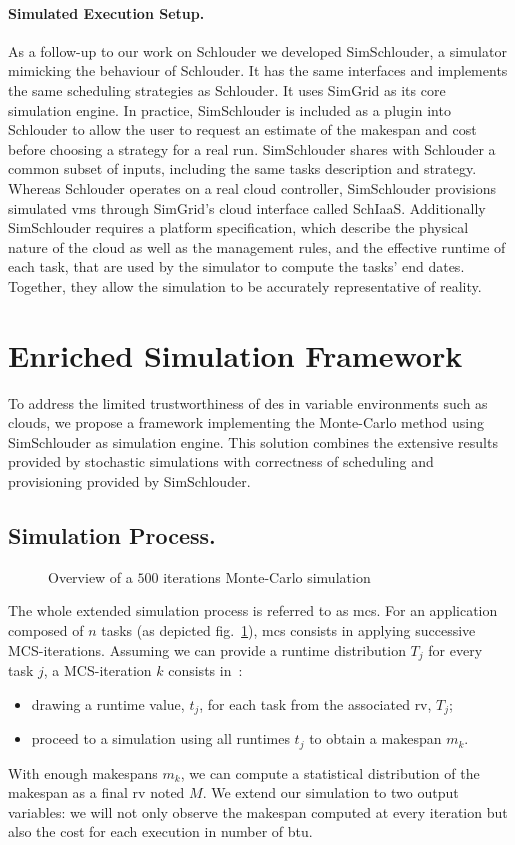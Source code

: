 \documentclass[]{llncs}
\begin{document}
\paragraph{Simulated Execution Setup.}
As a follow-up to our work on Schlouder we developed SimSchlouder, a simulator
mimicking the behaviour of Schlouder. It has the same interfaces and implements
the same scheduling strategies as Schlouder. It uses SimGrid as its core
simulation engine. In practice, SimSchlouder is included as a plugin into
Schlouder to allow the user to request an estimate of the makespan and cost
before choosing a strategy for a real run.
%
SimSchlouder  shares with Schlouder a common subset of inputs, including
the same tasks description and strategy. Whereas Schlouder operates on a
real cloud controller, SimSchlouder provisions simulated \acp{vm} through
SimGrid's cloud interface called SchIaaS. Additionally SimSchlouder requires a
platform specification, which describe the physical nature of the cloud as well
as the management rules, and the effective runtime of each task, that are used
by the simulator to compute the tasks' end dates. Together, they allow the
simulation to be accurately representative of reality.

\section{Enriched Simulation Framework}\label{sec:enriched-sim}


To address the limited trustworthiness of \ac{des} in variable environments such
as clouds, we propose a framework implementing the Monte-Carlo method using 
SimSchlouder as simulation engine. This  solution combines the extensive results
provided  by stochastic simulations with correctness of scheduling and 
provisioning provided by SimSchlouder.

\subsection{Simulation Process.}
\begin{figure}[bt]
	\centering
	\resizebox{0.6\textwidth}{!}{%
		
		}
\caption{Overview of a $500$ iterations Monte-Carlo simulation}\label{fig:mc-process}
\end{figure}
The whole extended simulation process is referred to as \ac{mcs}. 
For an application composed of $n$ tasks (as depicted fig.~\ref{fig:mc-process}),
\ac{mcs} consists in applying successive MCS-iterations. Assuming we can provide a
runtime distribution $T_j$ for every task $j$, a MCS-iteration $k$ consists in~:
\begin{itemize}
\item drawing a runtime value, $t_j$, for each task from the associated
	\acs{rv}, $T_j$;
\item proceed to a simulation using all runtimes $t_j$ to obtain a makespan $m_k$.
\end{itemize}
With enough  makespans $m_k$, we can  compute a statistical distribution  of the
makespan as a  final \ac{rv} noted $M$.  We extend our simulation  to two output
variables: we will not only observe the makespan computed at every iteration but
also the cost for each execution in number of \ac{btu}.
\end{document}
